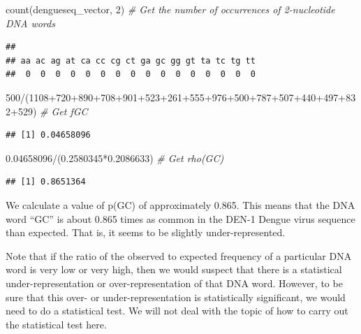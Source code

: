 \documentclass[
]{book}
\newenvironment{Shaded}{\begin{snugshade}}{\end{snugshade}}
\newcommand{\CommentTok}[1]{\textcolor[rgb]{0.56,0.35,0.01}{\textit{#1}}}
\newcommand{\DecValTok}[1]{\textcolor[rgb]{0.00,0.00,0.81}{#1}}
\newcommand{\FloatTok}[1]{\textcolor[rgb]{0.00,0.00,0.81}{#1}}
\newcommand{\FunctionTok}[1]{\textcolor[rgb]{0.00,0.00,0.00}{#1}}
\newcommand{\NormalTok}[1]{#1}
\newcommand{\SpecialCharTok}[1]{\textcolor[rgb]{0.00,0.00,0.00}{#1}}
\begin{document}
\begin{Shaded}
\begin{Highlighting}[]
 \FunctionTok{count}\NormalTok{(dengueseq\_vector, }\DecValTok{2}\NormalTok{) }\CommentTok{\# Get the number of occurrences of 2{-}nucleotide DNA words}
\end{Highlighting}
\end{Shaded}

\begin{verbatim}
## 
## aa ac ag at ca cc cg ct ga gc gg gt ta tc tg tt 
##  0  0  0  0  0  0  0  0  0  0  0  0  0  0  0  0
\end{verbatim}

\begin{Shaded}
\begin{Highlighting}[]
\DecValTok{500}\SpecialCharTok{/}\NormalTok{(}\DecValTok{1108}\SpecialCharTok{+}\DecValTok{720}\SpecialCharTok{+}\DecValTok{890}\SpecialCharTok{+}\DecValTok{708}\SpecialCharTok{+}\DecValTok{901}\SpecialCharTok{+}\DecValTok{523}\SpecialCharTok{+}\DecValTok{261}\SpecialCharTok{+}\DecValTok{555}\SpecialCharTok{+}\DecValTok{976}\SpecialCharTok{+}\DecValTok{500}\SpecialCharTok{+}\DecValTok{787}\SpecialCharTok{+}\DecValTok{507}\SpecialCharTok{+}\DecValTok{440}\SpecialCharTok{+}\DecValTok{497}\SpecialCharTok{+}\DecValTok{832}\SpecialCharTok{+}\DecValTok{529}\NormalTok{) }\CommentTok{\# Get fGC}
\end{Highlighting}
\end{Shaded}

\begin{verbatim}
## [1] 0.04658096
\end{verbatim}

\begin{Shaded}
\begin{Highlighting}[]
 \FloatTok{0.04658096}\SpecialCharTok{/}\NormalTok{(}\FloatTok{0.2580345}\SpecialCharTok{*}\FloatTok{0.2086633}\NormalTok{) }\CommentTok{\# Get rho(GC)}
\end{Highlighting}
\end{Shaded}

\begin{verbatim}
## [1] 0.8651364
\end{verbatim}

We calculate a value of p(GC) of approximately 0.865. This means that the DNA word ``GC'' is about 0.865 times as common in the DEN-1 Dengue virus sequence than expected. That is, it seems to be slightly under-represented.

Note that if the ratio of the observed to expected frequency of a particular DNA word is very low or very high, then we would suspect that there is a statistical under-representation or over-representation of that DNA word. However, to be sure that this over- or under-representation is statistically significant, we would need to do a statistical test. We will not deal with the topic of how to carry out the statistical test here.
\end{document}

